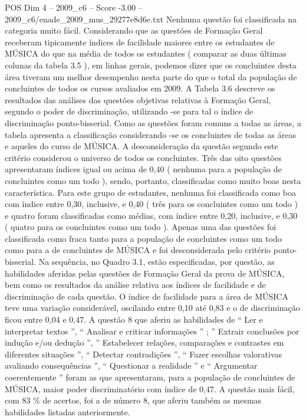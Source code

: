 \begin{textsample}{POS Dim 4 – 2009\_c6 – Score -3.00 – 2009\_c6/enade\_2009\_mus\_29277e8d6e.txt}
Nenhuma questão foi classificada na categoria muito fácil.
Considerando que as questões de Formação Geral receberam tipicamente índices de facilidade maiores entre os estudantes de MÚSICA do que na média de todos os estudantes ( comparar as duas últimas colunas da tabela 3.5 ), em linhas gerais, podemos dizer que os concluintes desta área tiveram um melhor desempenho nesta parte do que o total da população de concluintes de todos os cursos avaliados em 2009.
A Tabela 3.6 descreve os resultados das análises das questões objetivas relativas à Formação Geral, segundo o poder de discriminação, utilizando -se para tal o índice de discriminação ponto-bisserial.
Como as questões foram comuns a todas as áreas, a tabela apresenta a classificação considerando -se os concluintes de todas as áreas e aqueles do curso de MÚSICA.
A desconsideração da questão segundo este critério considerou o universo de todos os concluintes.
Três das oito questões apresentaram índices igual ou acima de 0,40 ( nenhuma para a população de concluintes como um todo ), sendo, portanto, classificadas como muito boas nesta característica.
Para este grupo de estudantes, nenhuma foi classificada como boa com índice entre 0,30, inclusive, e 0,40 ( três para os concluintes como um todo ) e quatro foram classificadas como médias, com índice entre 0,20, inclusive, e 0,30 ( quatro para os concluintes como um todo ).
Apenas uma das questões foi classificada como fraca tanto para a população de concluintes como um todo como para a de concluintes de MÚSICA e foi desconsiderada pelo critério ponto-bisserial.
Na sequência, no Quadro 3.1, estão especificadas, por questão, as habilidades aferidas pelas questões de Formação Geral da prova de MÚSICA, bem como os resultados da análise relativa aos índices de facilidade e de discriminação de cada questão.
O índice de facilidade para a área de MÚSICA teve uma variação considerável, oscilando entre 0,10 até 0,83 e o de discriminação ficou entre 0,04 e 0,47.
A questão 8 que aferiu as habilidades de “ Ler e interpretar textos ”, “ Analisar e criticar informações ” ; ” Extrair conclusões por indução e/ou dedução ”, ” Estabelecer relações, comparações e contrastes em diferentes situações ”, “ Detectar contradições ”, “ Fazer escolhas valorativas avaliando consequências ”, “ Questionar a realidade ” e “ Argumentar coerentemente ” foram as que apresentaram, para a população de concluintes de MÚSICA, maior poder discriminatório com índice de 0,47.
A questão mais fácil, com 83 \% de acertos, foi a de número 8, que aferiu também as mesmas habilidades listadas anteriormente.

\end{textsample}
